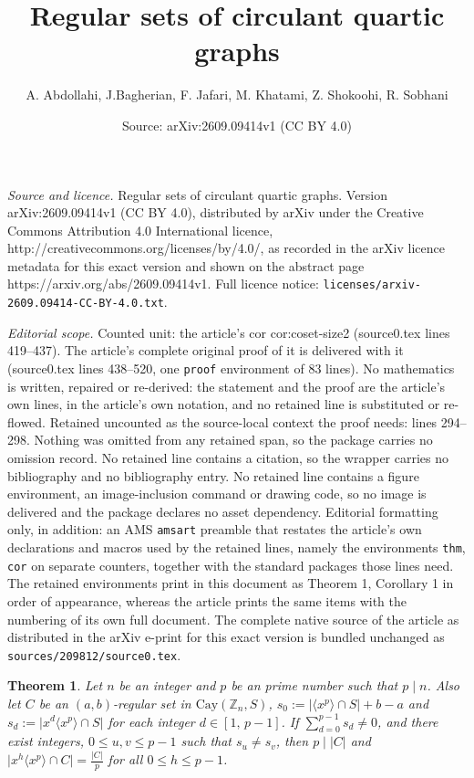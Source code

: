\documentclass[10pt,a4paper]{amsart}
\title{Regular sets of circulant quartic graphs}
\author{A. Abdollahi, J.Bagherian, F. Jafari, M. Khatami, Z. Shokoohi, R. Sobhani}
\date{Source: arXiv:2609.09414v1 (CC BY 4.0)}
\newtheorem{thm}{Theorem}
\begin{document}
\maketitle

\noindent\emph{Source and licence.} Regular sets of circulant quartic graphs. Version arXiv:2609.09414v1 (CC BY 4.0), distributed by arXiv under the Creative Commons Attribution 4.0 International licence, http://creativecommons.org/licenses/by/4.0/, as recorded in the arXiv licence metadata for this exact version and shown on the abstract page https://arxiv.org/abs/2609.09414v1. Full licence notice: \texttt{licenses/arxiv-2609.09414-CC-BY-4.0.txt}.\par\smallskip

\noindent\textit{Editorial scope.} Counted unit: the article's cor cor:coset-size2 (source0.tex lines 419--437). The article's complete original proof of it is delivered with it (source0.tex lines 438--520, one \texttt{proof} environment of 83 lines). No mathematics is written, repaired or re-derived: the statement and the proof are the article's own lines, in the article's own notation, and no retained line is substituted or re-flowed.  Retained uncounted as the source-local context the proof needs: lines 294--298.  Nothing was omitted from any retained span, so the package carries no omission record.  No retained line contains a citation, so the wrapper carries no bibliography and no bibliography entry.  No retained line contains a figure environment, an image-inclusion command or drawing code, so no image is delivered and the package declares no asset dependency.  Editorial formatting only, in addition: an AMS \texttt{amsart} preamble that restates the article's own declarations and macros used by the retained lines, namely the environments \texttt{thm}, \texttt{cor} on separate counters, together with the standard packages those lines need.  The retained environments print in this document as Theorem 1, Corollary 1 in order of appearance, whereas the article prints the same items with the numbering of its own full document.  The complete native source of the article as distributed in the arXiv e-print for this exact version is bundled unchanged as \texttt{sources/209812/source0.tex}.
	\begin{thm}\label{khi3}
		Let $n$ be an integer and $p$ be an prime number such that  $p \mid n$. Also let $C$ be an $(a,b)$-regular set in $\mathrm{Cay}(\mathbb{Z}_n, S)$, $s_0 := \lvert \langle x^p \rangle \cap S \rvert + b - a$ and
		$s_d := \lvert x^d \langle x^p \rangle \cap S \rvert$ for each integer $d \in [1,\, p-1]$. If $\sum_{d=0}^{p-1}s_d\neq 0$, and there exist integers, $0 \leq u,v \leq p-1$ such that $s_u \neq s_v$, then $p \mid |C|$ and
		$\lvert x^h \langle x^p \rangle \cap C \rvert = \frac{|C|}{p}$ for all \(0 \le h \le p-1\).
	\end{thm}
\end{document}
